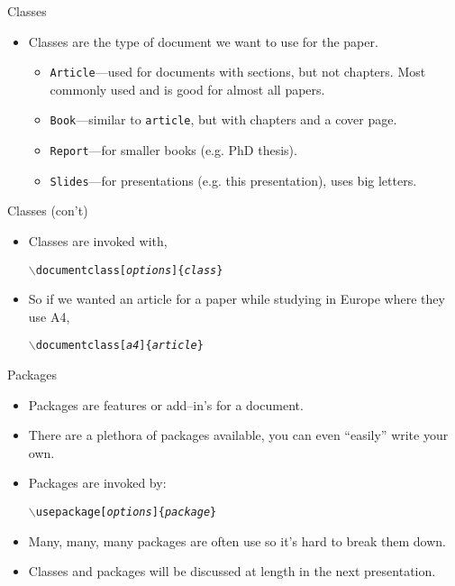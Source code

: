 \documentclass[pdf]{prosper}
\begin{document}
\begin{slide}{Classes}
	\begin{itemize}
		\item Classes are the type of document we want to use for the paper.
			\begin{itemize}
				\item \texttt{Article}---used for documents with sections, but not chapters. Most commonly used and is good for almost all papers.
				\item \texttt{Book}---similar to \texttt{article}, but with chapters and a cover page.
				\item \texttt{Report}---for smaller books (e.g. PhD thesis).
				\item \texttt{Slides}---for presentations (e.g. this presentation), uses big letters.
			\end{itemize}
	\end{itemize}
\end{slide}
\begin{slide}{Classes (con't)}
	\begin{itemize}
		\item Classes are invoked with,
			\begin{center}
			\texttt{$\backslash$documentclass[\textit{options}]\{\textit{class}\}}
			\end{center}
		\item So if we wanted an article for a paper while studying in Europe where they use A4,
			\begin{center}
			\texttt{$\backslash$documentclass[\textit{a4}]\{\textit{article}\}}
			\end{center}
	\end{itemize}
\end{slide}
\begin{slide}{Packages}
	\begin{itemize}
		\item Packages are features or add--in's for a document.
		\item There are a plethora of packages available, you can even ``easily'' write your own.
		\item Packages are invoked by:
			\begin{center}
			\texttt{$\backslash$usepackage[\textit{options}]\{\textit{package}\}}
			\end{center}
		\item Many, many, many packages are often use so it's hard to break them down.
		\item Classes and packages will be discussed at length in the next presentation.
	\end{itemize}
\end{slide}
\end{document}
